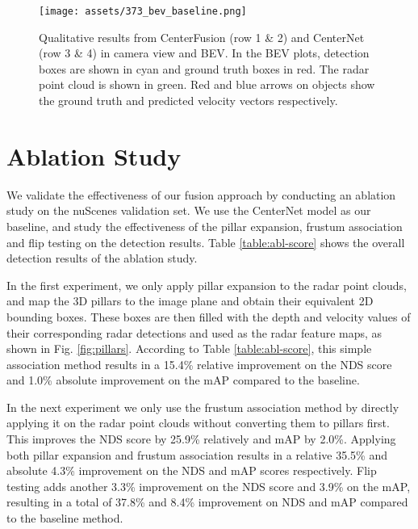 \documentclass[10pt,twocolumn,letterpaper]{article}
\begin{document}
\begin{figure*}[ht!]
       \endminipage \hspace{1pt}
           \texttt{[image: assets/373\_bev\_baseline.png]}
       \endminipage\\
      \caption{Qualitative results from CenterFusion (row 1 \& 2) and CenterNet
           (row 3 \& 4) in camera view and BEV. In the BEV plots, 
           detection boxes are shown in {\color{cyan} cyan} and ground truth boxes
           in {\color{red} red}. The radar point cloud is shown in 
           {\color{ForestGreen} green}. Red and blue arrows on objects show the ground 
           truth and predicted velocity vectors respectively.}
      \label{fig:res}
   \end{figure*}
   

   
   \section{Ablation Study}
   We validate the effectiveness of our fusion approach by conducting an ablation study
   on the nuScenes validation set. We use the CenterNet model as our baseline, and 
   study the effectiveness of the pillar expansion, frustum association and flip testing
   on the detection results. Table \ref{table:abl-score} shows the overall detection
   results of the ablation study.
   
   In the first experiment, we only apply pillar expansion to the radar point clouds,
   and map the 3D pillars to the image plane and obtain their equivalent 2D bounding boxes.
   These boxes are then filled with the depth and velocity values of their corresponding 
   radar detections and used as the radar feature maps, as shown in Fig. \ref{fig:pillars}.
   According to Table \ref{table:abl-score}, this simple association method results in 
   a 15.4\% relative improvement on the NDS score and 1.0\% absolute improvement on the 
   mAP compared to the baseline. 
   
   In the next experiment we only use the frustum association method by directly 
   applying it on the radar point clouds without converting them to pillars first.
   This improves the NDS score by 25.9\% relatively and mAP by 2.0\%. Applying 
   both pillar expansion and frustum association results in a relative 35.5\% and 
   absolute 4.3\% improvement on the NDS and mAP scores respectively.
   Flip testing adds another 3.3\% improvement on the NDS 
   score and 3.9\% on the mAP, resulting in a total of 37.8\% and 8.4\% improvement 
   on NDS and mAP compared to the baseline method. 
   
\end{document}
